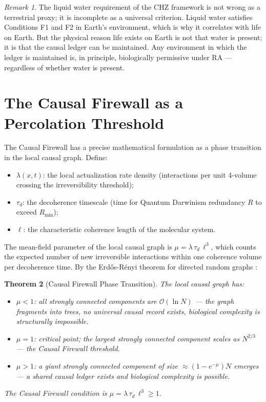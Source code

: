 \documentclass[11pt,a4paper]{article}
\theoremstyle{plain}
\newtheorem{theorem}{Theorem}[section]
\theoremstyle{definition}
\theoremstyle{remark}
\newtheorem{remark}[theorem]{Remark}
\begin{document}
\begin{remark}
The liquid water requirement of the CHZ framework is not wrong as a
terrestrial proxy; it is incomplete as a universal criterion. Liquid water
satisfies Conditions F1 and F2 in Earth's environment, which is why it
correlates with life on Earth. But the physical reason life exists on
Earth is not that water is present; it is that the causal ledger can be
maintained. Any environment in which the ledger is maintained is, in
principle, biologically permissive under RA --- regardless of whether
water is present.
\end{remark}

\section{The Causal Firewall as a Percolation Threshold}
\label{sec:percolation}

The Causal Firewall has a precise mathematical formulation as a phase
transition in the local causal graph. Define:
\begin{itemize}[noitemsep]
  \item $\lambda(x,t)$: the local actualization rate density (interactions
    per unit 4-volume crossing the irreversibility threshold);
  \item $\tau_d$: the decoherence timescale (time for Quantum Darwinism
    redundancy $R$ to exceed $R_{\min}$);
  \item $\ell$: the characteristic coherence length of the molecular system.
\end{itemize}

The mean-field parameter of the local causal graph is
$\mu = \lambda\,\tau_d\,\ell^3$, which counts the expected number of new
irreversible interactions within one coherence volume per decoherence time.
By the Erd\H{o}s-R\'{e}nyi theorem for directed random graphs
\citep{ErdosRenyi1960}:

\begin{theorem}[Causal Firewall Phase Transition]
\label{thm:percolation}
The local causal graph has:
\begin{itemize}[noitemsep]
  \item $\mu < 1$: all strongly connected components are $\mathcal{O}(\ln N)$
    --- the graph fragments into trees, no universal causal record exists,
    biological complexity is structurally impossible.
  \item $\mu = 1$: critical point; the largest strongly connected component
    scales as $N^{2/3}$ --- the Causal Firewall threshold.
  \item $\mu > 1$: a giant strongly connected component of size
    $\approx(1-e^{-\mu})N$ emerges --- a shared causal ledger exists and
    biological complexity is possible.
\end{itemize}
The Causal Firewall condition is $\mu = \lambda\,\tau_d\,\ell^3 \geq 1$.
\end{theorem}
\end{document}
